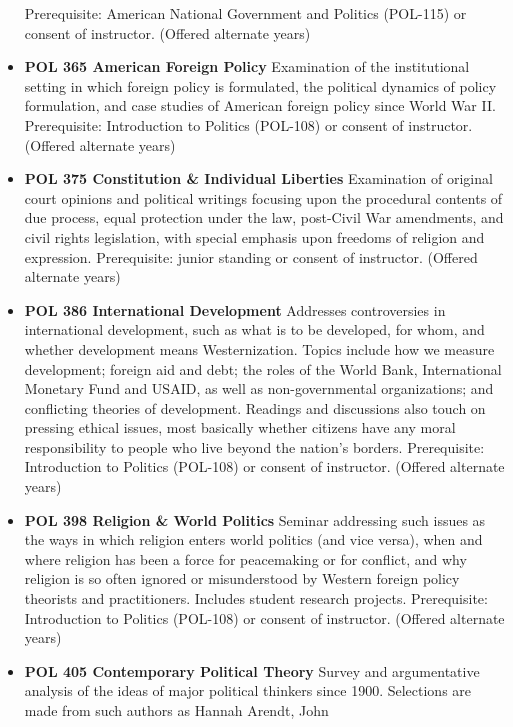 \documentclass[
  letterpaper,
]{scrbook}
\begin{document}
\begin{itemize}
  Prerequisite: American National Government and Politics (POL-115) or
  consent of instructor. (Offered alternate years)\\
\item
  \textbf{POL 365 American Foreign Policy} Examination of the
  institutional setting in which foreign policy is formulated, the
  political dynamics of policy formulation, and case studies of American
  foreign policy since World War II. Prerequisite: Introduction to
  Politics (POL-108) or consent of instructor. (Offered alternate
  years)\\
\item
  \textbf{POL 375 Constitution \& Individual Liberties} Examination of
  original court opinions and political writings focusing upon the
  procedural contents of due process, equal protection under the law,
  post-Civil War amendments, and civil rights legislation, with special
  emphasis upon freedoms of religion and expression. Prerequisite:
  junior standing or consent of instructor. (Offered alternate years)\\
\item
  \textbf{POL 386 International Development} Addresses controversies in
  international development, such as what is to be developed, for whom,
  and whether development means Westernization. Topics include how we
  measure development; foreign aid and debt; the roles of the World
  Bank, International Monetary Fund and USAID, as well as
  non-governmental organizations; and conflicting theories of
  development. Readings and discussions also touch on pressing ethical
  issues, most basically whether citizens have any moral responsibility
  to people who live beyond the nation's borders. Prerequisite:
  Introduction to Politics (POL-108) or consent of instructor. (Offered
  alternate years)
\item
  \textbf{POL 398 Religion \& World Politics} Seminar addressing such
  issues as the ways in which religion enters world politics (and vice
  versa), when and where religion has been a force for peacemaking or
  for conflict, and why religion is so often ignored or misunderstood by
  Western foreign policy theorists and practitioners. Includes student
  research projects. Prerequisite: Introduction to Politics (POL-108) or
  consent of instructor. (Offered alternate years)\\
\item
  \textbf{POL 405 Contemporary Political Theory} Survey and
  argumentative analysis of the ideas of major political thinkers since
  1900. Selections are made from such authors as Hannah Arendt, John

\end{itemize}
\end{document}
